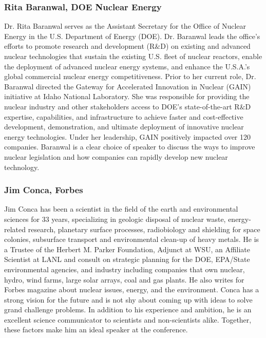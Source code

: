 \subsubsection{Rita Baranwal, DOE Nuclear Energy}
Dr. Rita Baranwal serves as the Assistant Secretary for the Office of Nuclear Energy in the U.S. Department of Energy (DOE).  Dr. Baranwal leads the office’s efforts to promote research and development (R$\&$D) on existing and advanced nuclear technologies that sustain the existing U.S. fleet of nuclear reactors, enable the deployment of advanced nuclear energy systems, and enhance the U.S.A.'s global commercial nuclear energy competitiveness. Prior to her current role, Dr. Baranwal directed the Gateway for Accelerated Innovation in Nuclear (GAIN) initiative at Idaho National Laboratory.  She was responsible for providing the nuclear industry and other stakeholders access to DOE's state-of-the-art R$\&$D expertise, capabilities, and infrastructure to achieve faster and cost-effective development, demonstration, and ultimate deployment of innovative nuclear energy technologies. Under her leadership, GAIN positively impacted over 120 companies. Baranwal is a clear choice of speaker to discuss the ways to improve nuclear legislation and how companies can rapidly develop new nuclear technology.


\subsubsection{Jim Conca, Forbes}
Jim Conca has been a scientist in the field of the earth and environmental sciences for 33 years, specializing in geologic disposal of nuclear waste, energy-related research, planetary surface processes, radiobiology and shielding for space colonies, subsurface transport and environmental clean-up of heavy metals. He is a Trustee of the Herbert M. Parker Foundation, Adjunct at WSU, an Affiliate Scientist at LANL and consult on strategic planning for the DOE, EPA/State environmental agencies, and industry including companies that own nuclear, hydro, wind farms, large solar arrays, coal and gas plants. He also writes for Forbes magazine about nuclear issues, energy, and the environment. Conca has a strong vision for the future and is not shy about coming up with ideas to solve grand challenge problems. In addition to his experience and ambition, he is an excellent science communicator to scientists and non-scientists alike. Together, these factors make him an ideal speaker at the conference.

